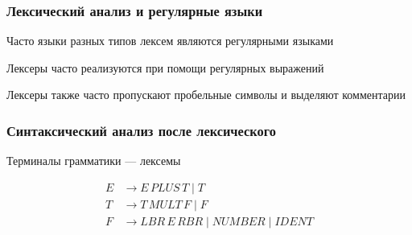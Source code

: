 \documentclass{beamer}
\begin{document}
\begin{frame}[fragile]
  \frametitle{Лексический анализ и регулярные языки}

  Часто языки разных типов лексем являются регулярными языками

  \bigskip

  Лексеры часто реализуются при помощи регулярных выражений

  \bigskip

  Лексеры также часто пропускают пробельные символы и выделяют комментарии
\end{frame}


\begin{frame}[fragile]
  \frametitle{Синтаксический анализ после лексического}

  \begin{center}
    Терминалы грамматики --- лексемы
  \end{center}

  \begin{align*}
    E &\to E \, PLUS \, T \mid T  \\
    T &\to T \, MULT \, F \mid F  \\
    F &\to LBR \, E \, RBR \mid NUMBER \mid IDENT \\
  \end{align*}

\end{frame}





\end{document}

